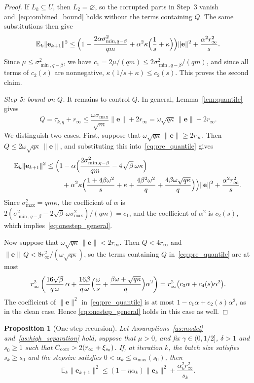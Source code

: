 \documentclass[pdflatex,sn-mathphys-num]{sn-jnl}
\theoremstyle{thmstyleone}
\newtheorem{proposition}{Proposition}
\theoremstyle{thmstylethree}
\newcommand{\proofstep}[1]{\par\medskip\noindent\emph{#1}}
\newcommand{\ve}{\mathbf{e}}
\begin{document}
\begin{proof}
If $L_k\subseteq U$, then $L_2=\varnothing$, so the corrupted parts in
Step~3 vanish and~\eqref{eq:combined_bound} holds without the terms
containing $Q$. The same substitutions then give
\[
\mathbb E_k\|\ve_{k+1}\|^2
\le\Bigl(1-\frac{2\alpha\sigma_{\min,q-\beta}^2}{qm}
+\alpha^2\kappa\Bigl(\frac1s+\kappa\Bigr)\Bigr)\|\ve\|^2
+\frac{\alpha^2r_\infty^2}{s}.
\]
Since $\mu\le\sigma_{\min,q-\beta}^2$, we have
$c_1=2\mu/(qm)\le2\sigma_{\min,q-\beta}^2/(qm)$, and since all terms of
$c_2(s)$ are nonnegative, $\kappa(1/s+\kappa)\le c_2(s)$. This proves the
second claim.

\proofstep{Step 5: bound on $Q$.} It remains to control $Q$. In
general, Lemma~\ref{lem:quantile} gives
\[
Q=\tau_{k,q}+r_\infty
\le\frac{\omega\sigma_{\max}}{\sqrt m}\|\ve\|+2r_\infty
=\omega\sqrt{q\kappa}\,\|\ve\|+2r_\infty .
\]
We distinguish two cases. First, suppose that
$\omega\sqrt{q\kappa}\,\|\ve\|\ge2r_\infty$. Then
$Q\le2\omega\sqrt{q\kappa}\,\|\ve\|$, and substituting this
into~\eqref{eq:pre_quantile} gives
\[
\begin{aligned}
\mathbb E_k\|\ve_{k+1}\|^2
\le{}&\Bigl(1-\alpha\Bigl(\frac{2\sigma_{\min,q-\beta}^2}{qm}
-4\sqrt\beta\,\omega\kappa\Bigr)\\
&\quad+\alpha^2\kappa\Bigl(\frac{1+4\beta\omega^2}{s}+\kappa
+\frac{4\beta^2\omega^2}{q}+\frac{4\beta\omega\sqrt{q\kappa}}{q}\Bigr)\Bigr)
\|\ve\|^2+\frac{\alpha^2r_\infty^2}{s}.
\end{aligned}
\]
Since $\sigma_{\max}^2=qm\kappa$, the coefficient of $\alpha$ is
$2(\sigma_{\min,q-\beta}^2-2\sqrt\beta\,\omega\sigma_{\max}^2)/(qm)=c_1$, and
the coefficient of $\alpha^2$ is $c_2(s)$, which
implies~\eqref{eq:onestep_general}.

Now suppose that $\omega\sqrt{q\kappa}\,\|\ve\|<2r_\infty$. Then
$Q<4r_\infty$ and $\|\ve\|\,Q<8r_\infty^2/(\omega\sqrt{q\kappa})$, so the
terms containing $Q$ in~\eqref{eq:pre_quantile} are at most
\[
r_\infty^2\left(\frac{16\sqrt\beta}{q\,\omega}\,\alpha
+\frac{16\beta}{q\,\omega}\Bigl(\frac{\omega}{s}
+\frac{\beta\omega+\sqrt{q\kappa}}{q}\Bigr)\alpha^2\right)
=r_\infty^2\bigl(c_3\alpha+c_4(s)\alpha^2\bigr).
\]
The coefficient of $\|\ve\|^2$ in~\eqref{eq:pre_quantile} is at most
$1-c_1\alpha+c_2(s)\alpha^2$, as in the clean case. Hence
\eqref{eq:onestep_general} holds in this case as well.
\end{proof}

\begin{proposition}[One-step recursion]
\label{prop:onestep}
Let Assumptions~\ref{as:model} and~\ref{as:high_separation} hold, suppose
that $\mu>0$, and fix $\gamma\in(0,1/2]$, $\delta>1$ and $s_0\ge1$ such that
$C_{\rm corr}>2(r_\infty+\xi_{s_0})$. If, at iteration $k$, the batch size
satisfies $s_k\ge s_0$ and the stepsize satisfies
$0<\alpha_k\le\alpha_{\max}(s_0)$, then
\[
\mathbb E_k\|\ve_{k+1}\|^2
\le(1-\eta\alpha_k)\|\ve_k\|^2+\frac{\alpha_k^2r_\infty^2}{s_k}.
\]
\end{proposition}
\end{document}

